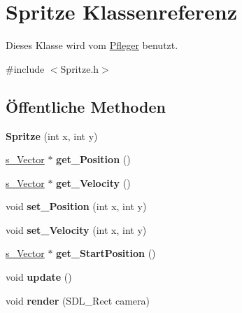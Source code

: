\hypertarget{class_spritze}{\section{Spritze Klassenreferenz}
\label{class_spritze}
}


Dieses Klasse wird vom \hyperlink{class_pfleger}{Pfleger} benutzt.  




{\ttfamily \#include $<$Spritze.\-h$>$}

\subsection*{Öffentliche Methoden}
\begin{DoxyCompactItemize}
\item 
\hypertarget{class_spritze_a786a149a9e6a937af87566a5c0ab432e}{{\bfseries Spritze} (int x, int y)}\label{class_spritze_a786a149a9e6a937af87566a5c0ab432e}

\item 
\hypertarget{class_spritze_aef30f9337f9559b4873ee895a0c8f4fe}{\hyperlink{structs___vector}{s\-\_\-\-Vector} $\ast$ {\bfseries get\-\_\-\-Position} ()}\label{class_spritze_aef30f9337f9559b4873ee895a0c8f4fe}

\item 
\hypertarget{class_spritze_ad5f7645d831b543b1ca92bd4ccb9c876}{\hyperlink{structs___vector}{s\-\_\-\-Vector} $\ast$ {\bfseries get\-\_\-\-Velocity} ()}\label{class_spritze_ad5f7645d831b543b1ca92bd4ccb9c876}

\item 
\hypertarget{class_spritze_acab9a7ff57ce3ce2f33a3480d04cbe19}{void {\bfseries set\-\_\-\-Position} (int x, int y)}\label{class_spritze_acab9a7ff57ce3ce2f33a3480d04cbe19}

\item 
\hypertarget{class_spritze_aa54b894d1a40b2c1156eb0e62779fa0e}{void {\bfseries set\-\_\-\-Velocity} (int x, int y)}\label{class_spritze_aa54b894d1a40b2c1156eb0e62779fa0e}

\item 
\hypertarget{class_spritze_a5d305371f76fb207684c203e7b4e5fd8}{\hyperlink{structs___vector}{s\-\_\-\-Vector} $\ast$ {\bfseries get\-\_\-\-Start\-Position} ()}\label{class_spritze_a5d305371f76fb207684c203e7b4e5fd8}

\item 
\hypertarget{class_spritze_aaf70068b9356284874156f19f5237c94}{void {\bfseries update} ()}\label{class_spritze_aaf70068b9356284874156f19f5237c94}

\item 
\hypertarget{class_spritze_a2d1fac0870a40d50f0582e1efec53751}{void {\bfseries render} (S\-D\-L\-\_\-\-Rect camera)}\label{class_spritze_a2d1fac0870a40d50f0582e1efec53751}

\end{DoxyCompactItemize}


